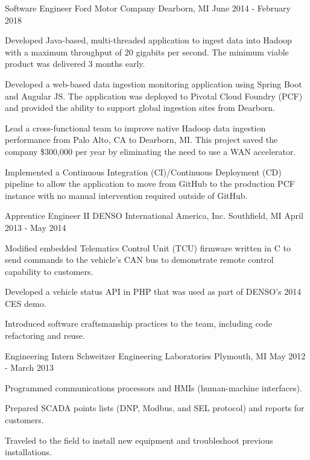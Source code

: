 \documentclass[11pt, a4paper]{awesome-cv}
\begin{document}
\begin{cventries}
    \cventry
    {Software Engineer}
    {Ford Motor Company}
    {Dearborn, MI}
    {June 2014 - February 2018}
    {
        \begin{cvitems}
            \item{Developed Java-based, multi-threaded application to ingest data into Hadoop with a maximum throughput of 20 gigabits per second. The minimum viable product was delivered 
                  3 months early.}
            \item{Developed a web-based data ingestion monitoring application using Spring Boot and Angular JS. The application was deployed to Pivotal Cloud Foundry (PCF) and provided the 
                  ability to support global ingestion sites from Dearborn.}
            \item{Lead a cross-functional team to improve native Hadoop data ingestion performance from Palo Alto, CA to Dearborn, MI. This project saved the company \$300,000 per year by 
                  eliminating the need to use a WAN accelerator.}
            \item{Implemented a Continuous Integration (CI)/Continuous Deployment (CD) pipeline to allow the application to move from GitHub to the production PCF instance with no manual 
                  intervention required outside of GitHub.}
        \end{cvitems}
    }
    
    \cventry
    {Apprentice Engineer II}
    {DENSO International America, Inc.}
    {Southfield, MI}
    {April 2013 - May 2014}
    {
        \begin{cvitems}
            \item{Modified embedded Telematics Control Unit (TCU) firmware written in C to send commands to the vehicle's CAN bus to demonstrate remote control capability to customers.}
            \item{Developed a vehicle status API in PHP that was used as part of DENSO's 2014 CES demo.}
            \item{Introduced software craftsmanship practices to the team, including code refactoring and reuse.}
        \end{cvitems}
    }
    
    \cventry
    {Engineering Intern}
    {Schweitzer Engineering Laboratories}
    {Plymouth, MI}
    {May 2012 - March 2013}
    {
        \begin{cvitems}
            \item{Programmed communications processors and HMIs (human-machine interfaces).}
            \item{Prepared SCADA points lists (DNP, Modbus, and SEL protocol) and reports for customers.}
            \item{Traveled to the field to install new equipment and troubleshoot previous installations.}
        \end{cvitems}
    }
\end{cventries}
\end{document}
